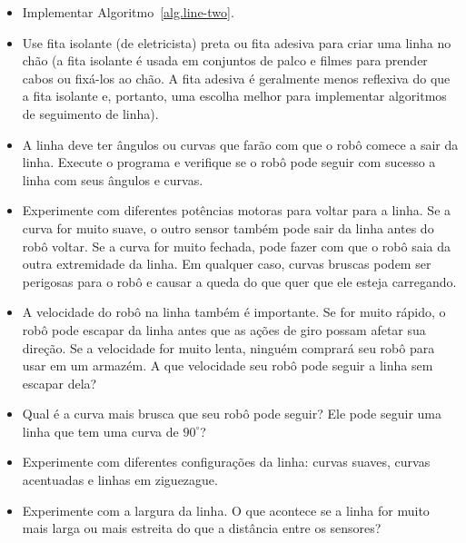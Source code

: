 \begin{framed}
\begin{itemize}
\item Implementar Algoritmo~\ref{alg.line-two}.
\item Use fita isolante (de eletricista) preta ou fita adesiva para criar uma linha no chão (a fita isolante é usada em conjuntos de palco e filmes para prender cabos ou fixá-los ao chão. A fita adesiva é geralmente menos reflexiva do que a fita isolante e, portanto, uma escolha melhor para implementar algoritmos de seguimento de linha).
\item A linha deve ter ângulos ou curvas que farão com que o robô comece a sair da linha. Execute o programa e verifique se o robô pode seguir com sucesso a linha com seus ângulos e curvas.
\item Experimente com diferentes potências motoras para voltar para a linha. Se a curva for muito suave, o outro sensor também pode sair da linha antes do robô voltar. Se a curva for muito fechada, pode fazer com que o robô saia da outra extremidade da linha. Em qualquer caso, curvas bruscas podem ser perigosas para o robô e causar a queda do que quer que ele esteja carregando.
\item A velocidade do robô na linha também é importante. Se for muito rápido, o robô pode escapar da linha antes que as ações de giro possam afetar sua direção. Se a velocidade for muito lenta, ninguém comprará seu robô para usar em um armazém. A que velocidade seu robô pode seguir a linha sem escapar dela?
\end{itemize}
\end{framed}

\begin{framed}
\begin{itemize}
\item Qual é a curva mais brusca que seu robô pode seguir? Ele pode seguir uma linha que tem uma curva de $90^{\circ}$?
\item Experimente com diferentes configurações da linha: curvas suaves, curvas acentuadas e linhas em ziguezague.
\item Experimente com a largura da linha. O que acontece se a linha for muito mais larga ou mais estreita do que a distância entre os sensores?
\end{itemize}
\end{framed}


